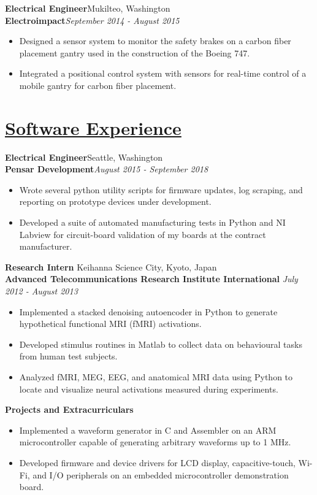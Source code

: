 \documentclass[a4paper, 11pt]{article}
\begin{document}
  \textbf{Electrical Engineer}\hfill Mukilteo, Washington\\
  \textbf{Electroimpact}\hfill \emph{September 2014 - August 2015}\smallskip
  \begin{itemize}[nosep]
    \item Designed a sensor system to monitor the safety brakes on a carbon fiber placement gantry used in the construction of the Boeing 747.
    \item Integrated a positional control system with sensors for real-time control of a mobile gantry for carbon fiber placement.
  \end{itemize}
  \medbreak
  
\section{\underline{Software Experience}}
  \textbf{Electrical Engineer}\hfill Seattle, Washington\\
  \textbf{Pensar Development}\hfill \emph{August 2015 - September 2018}\smallskip
  \begin{itemize}[nosep]
    \item Wrote several python utility scripts for firmware updates, log scraping, and reporting on prototype devices under development.
    \item Developed a suite of automated manufacturing tests in Python and NI Labview for circuit-board validation of my boards at the contract manufacturer.
  \end{itemize}
  \medskip
  
  \textbf{Research Intern} \hfill Keihanna Science City, Kyoto, Japan \\
  \textbf{Advanced Telecommunications Research Institute International} \hfill \emph{July 2012 - August 2013}\smallskip
  \begin{itemize}[nosep]
    \item Implemented a stacked denoising autoencoder in Python to generate hypothetical functional MRI (fMRI) activations.
    \item Developed stimulus routines in Matlab to collect data on behavioural tasks from human test subjects.
    \item Analyzed fMRI, MEG, EEG, and anatomical MRI data using Python to locate and visualize neural activations measured during experiments.
  \end{itemize}
  \medskip

  \textbf{Projects and Extracurriculars}
  \begin{itemize}[nosep]
    \item Implemented a waveform generator in C and Assembler on an ARM microcontroller capable of generating arbitrary waveforms up to 1 MHz.
    \item Developed firmware and device drivers for LCD display, capacitive-touch, Wi-Fi, and I/O peripherals on an embedded microcontroller demonstration board.
  \end{itemize}
\end{document}
